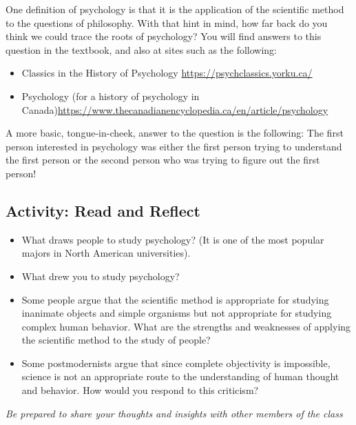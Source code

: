 \documentclass[
]{book}
\providecommand{\tightlist}{%
  \setlength{\itemsep}{0pt}\setlength{\parskip}{0pt}}
\begin{document}
One definition of psychology is that it is the application of the scientific method to the questions of philosophy. With that hint in mind, how far back do you think we could trace the roots of psychology? You will find answers to this question in the textbook, and also at sites such as the following:

\begin{itemize}
\tightlist
\item
  Classics in the History of Psychology {\url{https://psychclassics.yorku.ca/}}\\
\item
  Psychology (for a history of psychology in Canada){\url{https://www.thecanadianencyclopedia.ca/en/article/psychology}}
\end{itemize}

A more basic, tongue-in-cheek, answer to the question is the following: The first person interested in psychology was either the first person trying to understand the first person or the second person who was trying to figure out the first person!

\hypertarget{activity-read-and-reflect}{%
\subsection*{Activity: Read and Reflect}\label{activity-read-and-reflect}}

\begin{reflect}
\begin{itemize}
\tightlist
\item
  What draws people to study psychology? (It is one of the most popular majors in North American universities).\\
\item
  What drew you to study psychology?\\
\item
  Some people argue that the scientific method is appropriate for studying inanimate objects and simple organisms but not appropriate for studying complex human behavior. What are the strengths and weaknesses of applying the scientific method to the study of people?\\
\item
  Some postmodernists argue that since complete objectivity is impossible, science is not an appropriate route to the understanding of human thought and behavior. How would you respond to this criticism?
\end{itemize}

\emph{Be prepared to share your thoughts and insights with other members of the class}
\end{reflect}
\end{document}
